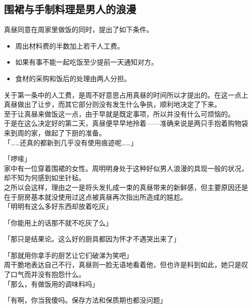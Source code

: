 \subsection{围裙与手制料理是男人的浪漫}

真昼同意在周家里做饭的同时，提出了如下条件。\\

\begin{itemize}
    \item 周出材料费的半数加上若干人工费。
    \item 如果有事不能一起吃饭至少提前一天通知对方。
    \item 食材的采购和饭后的处理由两人分担。
\end{itemize}

关于第一条中的人工费，是周不好意思占用真昼的时间所以才提出的。在这一点上真昼做出了让步，而其它部分则没有发生什么争执，顺利地决定了下来。\\

至于让真昼来做饭这一点，由于早就是既定事项，所以并没有什么可烦恼的。\\

于是在这么决定好的第二天，真昼便早早地拎着——准确来说是两只手抱着购物袋来到周的家，做起了下厨的准备。\\

「……还真的都新到几乎没有使用痕迹呢……」

「啰嗦」\\

家中有一位穿着围裙的女性。周明明身处于这种好似男人浪漫的具现一般的状况，却不知为何感到如坐针毡。\\

之所以会这样，理由之一是将头发扎成一束的真昼带来的新鲜感，但主要原因还是在于厨房基本就没使用过这点被真昼再次指出所造成的尴尬。\\

「明明有这么多好东西却放着吃灰」

「你能用上的话那不就不吃灰了么」

「那只是结果论。这么好的厨具都因为怀才不遇哭出来了」

「那就用你拿手的厨艺让它们破涕为笑吧」\\

周干脆地表达自己不行，真昼则一脸无语地看着他，但也许是料到如此，她只是叹了口气而并没有抱怨什么。\\

「那么，有做饭用的调味料吗」

「有啊，你当我傻吗。保存方法和保质期也都没问题」

